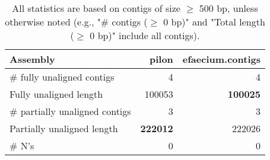 \documentclass[12pt,a4paper]{article}
\begin{document}
\begin{table}[ht]
\begin{center}
\caption{All statistics are based on contigs of size $\geq$ 500 bp, unless otherwise noted (e.g., "\# contigs ($\geq$ 0 bp)" and "Total length ($\geq$ 0 bp)" include all contigs).}
\begin{tabular}{|l*{2}{|r}|}
\hline
Assembly & pilon & efaecium.contigs \\ \hline
\# fully unaligned contigs & 4 & 4 \\ \hline
Fully unaligned length & 100053 & {\bf 100025} \\ \hline
\# partially unaligned contigs & 3 & 3 \\ \hline
Partially unaligned length & {\bf 222012} & 222026 \\ \hline
\# N's & 0 & 0 \\ \hline
\end{tabular}
\end{center}
\end{table}
\end{document}
